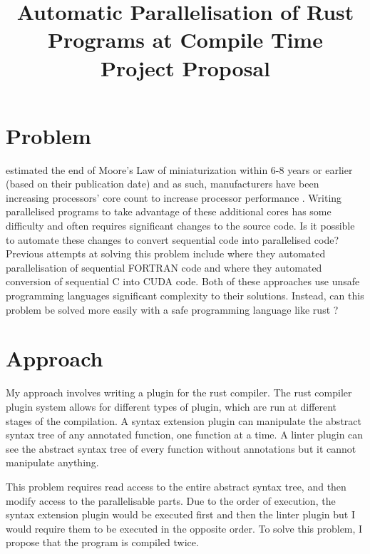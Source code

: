\documentclass[12pt, a4paper]{article}
\title{
	\vspace{-4ex}
	\LARGE\textbf{Automatic Parallelisation of Rust Programs at Compile Time} \\
	\vspace{1ex}
	\large\textbf{Project Proposal}
	\vspace{-9ex}
}
\date{}
\begin{document}
\maketitle

\section{Problem}
\textcite{kish2002end} estimated the end of Moore's Law of miniaturization within 6-8 years or earlier (based on their publication date) and as such, manufacturers have been increasing processors' core count to increase processor performance \parencite{geer2005chip}. Writing parallelised programs to take advantage of these additional cores has some difficulty and often requires significant changes to the source code. Is it possible to automate these changes to convert sequential code into parallelised code? Previous attempts at solving this problem include \textcite{d1998fortran} where they automated parallelisation of sequential FORTRAN code and \textcite{baskaran2010automatic} where they automated conversion of sequential C into CUDA code. Both of these approaches use unsafe programming languages significant complexity  to their solutions. Instead, can this problem be solved more easily with a safe programming language like rust \parencite{rustlang}?

\section{Approach}
\label{sec:approach}
My approach involves writing a plugin for the rust compiler. The rust compiler plugin system allows for different types of plugin, which are run at different stages of the compilation. A syntax extension plugin can manipulate the abstract syntax tree of any annotated function, one function at a time. A linter plugin can see the abstract syntax tree of every function without annotations but it cannot manipulate anything.

This problem requires read access to the entire abstract syntax tree, and then modify access to the parallelisable parts. Due to the order of execution, the syntax extension plugin would be executed first and then the linter plugin but I would require them to be executed in the opposite order. To solve this problem, I propose that the program is compiled twice.
\end{document}
